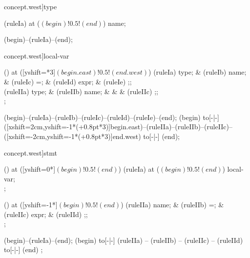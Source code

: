 \begin{syntax}[[xshift=22mm]concept.west]{type}
  
  \node[terminal] (ruleIa) at ($(begin)!0.5!(end)$) {name};
  
  \draw[path] (begin)--(ruleIa)--(end);
\end{syntax}
\begin{syntax}[[xshift=22mm]concept.west]{local-var}
  
  \node[sequence,anchor=north] () at ([yshift=\syntaxrulenodeheight-0.8pt*3]$(begin.east)!0.5!(end.west)$) {
    \node[nonterminal] (ruleIa) {type};
    &
    \node[terminal]    (ruleIb) {name};
    &
    \node[terminal]    (ruleIc) {=};
    &
    \node[nonterminal] (ruleId) {expr};
    &
    \node[terminal]    (ruleIe) {;};
    \\
    \node[nonterminal] (ruleIIa) {type};
    &
    \node[terminal]    (ruleIIb) {name};
    &
    &
    &
    \node[terminal]    (ruleIIc) {;};
    \\
  };
  
  \draw[path] (begin)--(ruleIa)--(ruleIb)--(ruleIc)--(ruleId)--(ruleIe)--(end);
  \draw[path] (begin) to[-|-] ([xshift=2cm,yshift=-1*(\syntaxruledist+0.8pt*3)]begin.east)--(ruleIIa)--(ruleIIb)--(ruleIIc)--([xshift=-2cm,yshift=-1*(\syntaxruledist+0.8pt*3)]end.west) to[-|-] (end);
\end{syntax}
\begin{syntax}[[xshift=22mm]concept.west]{stmt}
  
  \node[sequence] () at ([yshift=0*\syntaxruledist]$(begin)!0.5!(end)$) {
    \node[nonterminal] (ruleIa) at ($(begin)!0.5!(end)$) {local-var};
    \\
  };
  
  \node[sequence] () at ([yshift=-1*\syntaxruledist]$(begin)!0.5!(end)$) {
    \node[nonterminal] (ruleIIa) {name};
    &
    \node[terminal]    (ruleIIb) {=};
    &
    \node[nonterminal] (ruleIIc) {expr};
    &
    \node[terminal]    (ruleIId) {;};
    \\
  };
  
  
  \draw[path] (begin)--(ruleIa)--(end);
  \draw[path] (begin) to[-|-] (ruleIIa)
                           -- (ruleIIb)
                           -- (ruleIIc)
                           -- (ruleIId)
                      to[-|-] (end)
  ;
\end{syntax}

